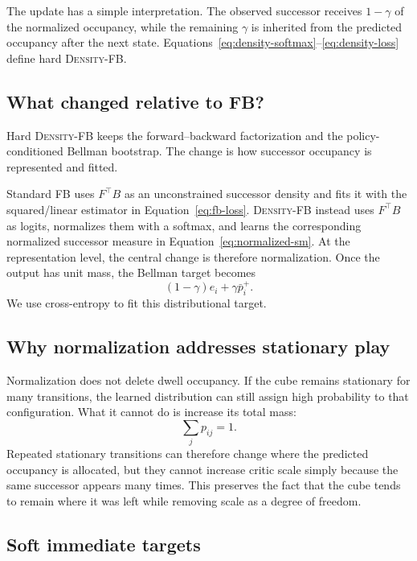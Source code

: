 \documentclass{article}
\newcommand{\DensityFB}{\textsc{Density-FB}}
\begin{document}
The update has a simple interpretation.
The observed successor receives $1-\gamma$ of the normalized occupancy, while the remaining $\gamma$ is inherited from the predicted occupancy after the next state.
Equations~\ref{eq:density-softmax}--\ref{eq:density-loss} define hard \DensityFB{}.

\subsection{What changed relative to FB?}

Hard \DensityFB{} keeps the forward--backward factorization and the policy-conditioned Bellman bootstrap.
The change is how successor occupancy is represented and fitted.

Standard FB uses $F^\top B$ as an unconstrained successor density and fits it with the squared/linear estimator in Equation~\ref{eq:fb-loss}.
\DensityFB{} instead uses $F^\top B$ as logits, normalizes them with a softmax, and learns the corresponding normalized successor measure in Equation~\ref{eq:normalized-sm}.
At the representation level, the central change is therefore normalization.
Once the output has unit mass, the Bellman target becomes
\begin{equation}
    (1-\gamma)e_i+\gamma\bar p_i^+.
\end{equation}
We use cross-entropy to fit this distributional target.

\subsection{Why normalization addresses stationary play}

Normalization does not delete dwell occupancy.
If the cube remains stationary for many transitions, the learned distribution can still assign high probability to that configuration.
What it cannot do is increase its total mass:
\begin{equation}
    \sum_j p_{ij}=1.
\end{equation}
Repeated stationary transitions can therefore change where the predicted occupancy is allocated, but they cannot increase critic scale simply because the same successor appears many times.
This preserves the fact that the cube tends to remain where it was left while removing scale as a degree of freedom.

\subsection{Soft immediate targets}
\end{document}
